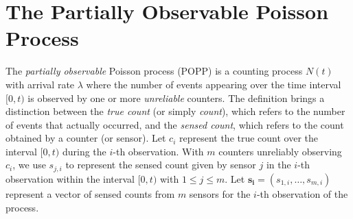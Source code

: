 
\section{The Partially Observable Poisson Process}
\label{sec:popp}

The \emph{partially observable} Poisson process (POPP) is a counting process $N(t)$ with arrival rate $\lambda$ where the number of events appearing over the time interval $[0, t)$ is observed by one or more \emph{unreliable} counters. 
% 
The definition brings a distinction between the \emph{true count} (or simply \emph{count}), which refers to the number of events that actually occurred, and the \emph{sensed count}, which refers to the count obtained by a counter (or sensor). Let $c_i$ represent the true count over the interval $[0, t)$ during the $i$-th observation. With $m$ counters unreliably observing $c_i$, we use  $s_{j,i}$ to represent the sensed count given by sensor $j$ in the $i$-th observation within the interval $[0, t)$ with $1 \leq j \leq m$. Let $\mathbf{s_i} = (s_{1,i}, \ldots, s_{m,i})$ represent a vector of sensed counts from $m$ sensors for the $i$-th observation of the process. 
% 

